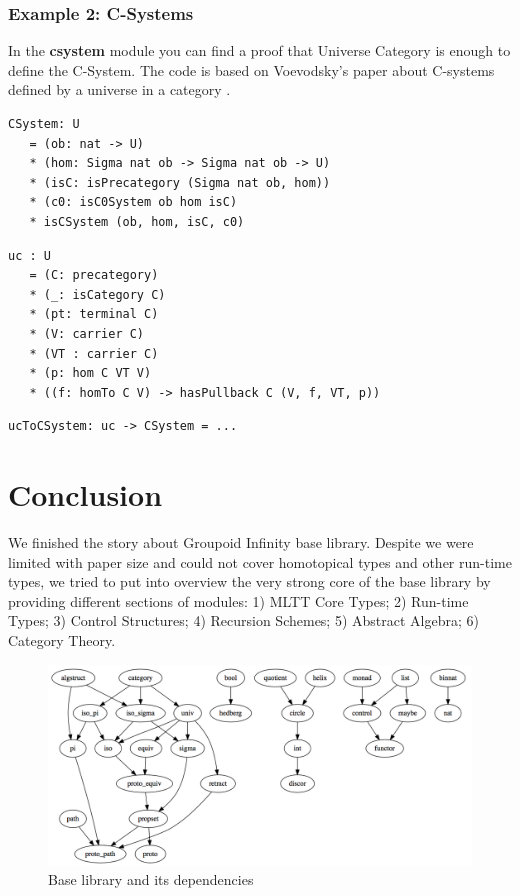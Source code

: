\documentclass{article}
\begin{document}
\subsubsection*{Example 2: C-Systems}

In the {\bf csystem} module you can find a proof that
Universe Category is enough to define the C-System. The code is based
on Voevodsky's paper about C-systems defined by a universe
in a category \cite{Voevodsky14}.

\begin{lstlisting}[mathescape=true]
CSystem: U
   = (ob: nat -> U)
   * (hom: Sigma nat ob -> Sigma nat ob -> U)
   * (isC: isPrecategory (Sigma nat ob, hom))
   * (c0: isC0System ob hom isC)
   * isCSystem (ob, hom, isC, c0)
\end{lstlisting}

\begin{lstlisting}[mathescape=true]
uc : U
   = (C: precategory)
   * (_: isCategory C)
   * (pt: terminal C)
   * (V: carrier C)
   * (VT : carrier C)
   * (p: hom C VT V)
   * ((f: homTo C V) -> hasPullback C (V, f, VT, p))
\end{lstlisting}

\begin{lstlisting}[mathescape=true]
ucToCSystem: uc -> CSystem = ...
\end{lstlisting}
\section{Conclusion}

We finished the story about Groupoid Infinity base library.
Despite we were limited with paper size and could not cover
homotopical types and other run-time types, we tried to put
into overview the very strong core of the base library by
providing different sections of modules:
1) MLTT Core Types; 2) Run-time Types; 3) Control Structures;
4) Recursion Schemes; 5) Abstract Algebra; 6) Category Theory.

\begin{figure}[h]
  \centerline{\includegraphics[scale=0.20]{baselib}}
  \caption{Base library and its dependencies}
\end{figure}
\end{document}

